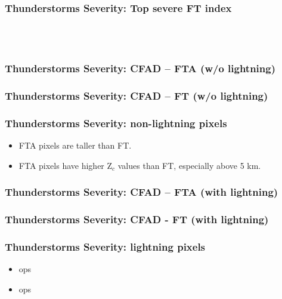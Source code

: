 \documentclass[smaller]{beamer}
\begin{document}
\begin{frame}
\frametitle{Thunderstorms Severity: Top severe FT index}
~~
\\
\\

\end{frame}

  
\begin{frame}
\frametitle{Thunderstorms Severity: CFAD -- FTA (w/o lightning)}

\end{frame}

\begin{frame}
\frametitle{Thunderstorms Severity: CFAD -- FT (w/o lightning)}

\end{frame}



\begin{frame}
\frametitle{Thunderstorms Severity: non-lightning pixels}
\begin{itemize}
\item FTA pixels are taller than FT.
\item FTA pixels have higher Z$_c$ values than FT, especially above 5 km.
\end{itemize}
\end{frame}

\begin{frame}
\frametitle{Thunderstorms Severity: CFAD -- FTA (with lightning) }

\end{frame}

\begin{frame}
\frametitle{Thunderstorms Severity: CFAD - FT (with lightning)}

\end{frame}



\begin{frame}
\frametitle{Thunderstorms Severity: lightning pixels}
\begin{itemize}
\item ops
\item ops
\end{itemize}
\end{frame}
\end{document}
